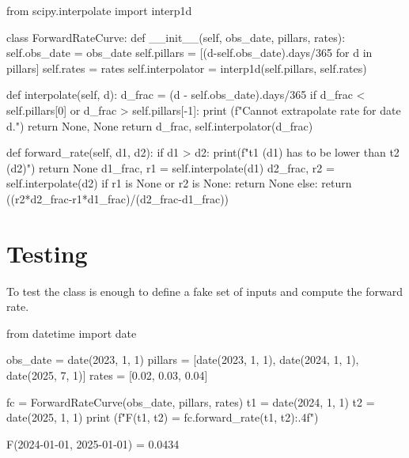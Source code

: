 \documentclass[]{article}
\begin{document}
\begin{ipython}
from scipy.interpolate import interp1d
	
class ForwardRateCurve:
	def __init__(self, obs_date, pillars, rates):
	    self.obs_date = obs_date
	    self.pillars = [(d-self.obs_date).days/365 for d in pillars]
	    self.rates = rates
	    self.interpolator = interp1d(self.pillars, self.rates)
	
	def interpolate(self, d):
	    d_frac = (d - self.obs_date).days/365
	    if d_frac < self.pillars[0] or d_frac > self.pillars[-1]:
	        print (f"Cannot extrapolate rate for date {d}.")
	        return None, None
	    return d_frac, self.interpolator(d_frac)
	    
	def forward_rate(self, d1, d2):
	    if d1 > d2:
	        print(f"t1 ({d1}) has to be lower than t2 ({d2})")
	        return None
	    d1_frac, r1 = self.interpolate(d1)
	    d2_frac, r2 = self.interpolate(d2)
	    if r1 is None or r2 is None:
	        return None
	    else:
	        return ((r2*d2_frac-r1*d1_frac)/(d2_frac-d1_frac))
\end{ipython}

\section{Testing}
To test the class is enough to define a fake set of inputs and compute the forward rate.
\begin{ipython}
from datetime import date

obs_date = date(2023, 1, 1)
pillars = [date(2023, 1, 1), date(2024, 1, 1), date(2025, 7, 1)]
rates = [0.02, 0.03, 0.04]

fc = ForwardRateCurve(obs_date, pillars, rates)
t1 = date(2024, 1, 1)
t2 = date(2025, 1, 1)
print (f"F({t1}, {t2}) = {fc.forward_rate(t1, t2):.4f}")	
\end{ipython}
\begin{ioutput}
F(2024-01-01, 2025-01-01) = 0.0434
\end{ioutput}
\end{document}
